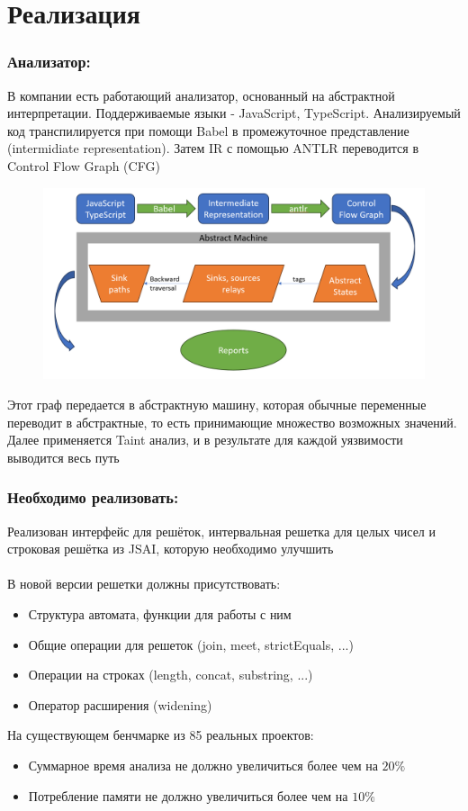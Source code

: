 \section{Реализация}

\subsubsection*{Анализатор:}
В компании есть работающий анализатор, основанный на абстрактной интерпретации. Поддерживаемые языки - JavaScript, TypeScript. Анализируемый код транспилируется при помощи Babel в промежуточное представление (intermidiate representation). Затем IR с помощью ANTLR переводится в Control Flow Graph (CFG)

\begin{figure}[H]
\includegraphics[width=\textwidth]{images/engine.png}\hfill
\end{figure}

Этот граф передается в абстрактную машину, которая обычные переменные переводит в абстрактные, то есть принимающие множество возможных значений. Далее применяется Taint анализ, и в результате для каждой уязвимости выводится весь путь

\newpage
\subsubsection*{Необходимо реализовать:}
Реализован интерфейс для решёток, интервальная решетка для целых чисел и строковая решётка из JSAI, которую необходимо улучшить\\ \\
В новой версии решетки должны присутствовать:
\begin{itemize}
    \item Структура автомата, функции для работы с ним
    \item Общие операции для решеток (join, meet, strictEquals, ...)
    \item Операции на строках (length, concat, substring, ...)
    \item Оператор расширения (widening)
\end{itemize}
На существующем бенчмарке из 85 реальных проектов:
\begin{itemize}
    \item Суммарное время анализа не должно увеличиться более чем на $20\%$
    \item Потребление памяти не должно увеличиться более чем на $10\%$
\end{itemize}



